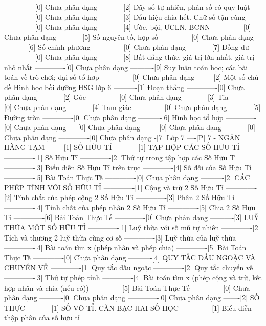 -------------[0] Chưa phân dạng
----------[2] Dãy số tự nhiên, phân số có quy luật
-------------[0] Chưa phân dạng
----------[3] Dấu hiệu chia hết. Chữ số tận cùng
-------------[0] Chưa phân dạng
----------[4] Ước, bội, ƯCLN, BCNN
-------------[0] Chưa phân dạng
----------[5] Số nguyên tố, hợp số
-------------[0] Chưa phân dạng
----------[6] Số chính phương
-------------[0] Chưa phân dạng
----------[7] Đồng dư
-------------[0] Chưa phân dạng
----------[8] Bất đẳng thức, giá trị lớn nhất, giá trị nhỏ nhất
-------------[0] Chưa phân dạng
----------[9] Suy luận toán học; các bài toán về trò chơi; đại số tổ hơp
-------------[0] Chưa phân dạng
-------[2] Một số chủ đề Hình học bồi dưỡng HSG lớp 6
----------[1] Đoạn thẳng
-------------[0] Chưa phân dạng
----------[2] Góc
-------------[0] Chưa phân dạng
----------[3] Tia
-------------[0] Chưa phân dạng
----------[4] Tam giác
-------------[0] Chưa phân dạng
----------[5] Đường tròn
-------------[0] Chưa phân dạng
----------[6] Hình học tổ hợp
-------------[0] Chưa phân dạng
----[0] Chưa phân dạng
-------[0] Chưa phân dạng
----------[0] Chưa phân dạng
-------------[0] Chưa phân dạng
-[7] Lớp 7
----[P] 7 - NGÂN HÀNG TẠM
-------[1] SỐ HỮU TỈ
----------[1] TẬP HỢP CÁC SỐ HỮU TỈ 
-------------[1] Số Hữu Tỉ
-------------[2] Thứ tự trong tập hợp các Số Hữu T
-------------[3] Biểu diễn Số Hữu Tỉ trên trục
-------------[4] Số đối của Số Hữu Tỉ
-------------[5] Bài Toán Thực Tế
-------------[0] Chưa phân dạng
----------[2] CÁC PHÉP TÍNH VỚI SỐ HỮU TỈ
-------------[1] Cộng và trừ 2 Số Hữu Tỉ
-------------[2] Tính chất của phép cộng 2 Số Hữu Tỉ
-------------[3] Phân 2 Số Hữu Tỉ
-------------[4] Tính chất của phép nhân 2 Số Hữu Tỉ
-------------[5] Chia 2 Số Hữu Tỉ
-------------[6] Bài Toán Thực Tế
-------------[0] Chưa phân dạng
----------[3] LUỸ THỪA MỘT SỐ HỮU TỈ
-------------[1] Luỹ thừa với số mũ tự nhiên
-------------[2] Tích và thương 2 luỹ thừa cùng cơ số
-------------[3] Luỹ thừa của luỹ thừa
-------------[4] Bài toán tìm x (phép nhân và phép chia)
-------------[5] Bài Toán Thực Tế
-------------[0] Chưa phân dạng
----------[4] QUY TẮC DẤU NGOẶC VÀ CHUYỂN VẾ
-------------[1] Quy tắc dấu ngoặc
-------------[2] Quy tắc chuyển vế
-------------[3] Thứ tự phép tính
-------------[4] Bài toán tìm x (phép cộng và trừ, kết hợp nhân và chia (nếu có))
-------------[5] Bài Toán Thực Tế
-------------[0] Chưa phân dạng
----------[0] Chưa phân dạng
-------------[0] Chưa phân dạng
-------[2] SỐ THỰC
----------[1] SỐ VÔ TỈ. CĂN BẬC HAI SỐ HỌC
-------------[1] Biểu diễn thập phân của số hữu tỉ
